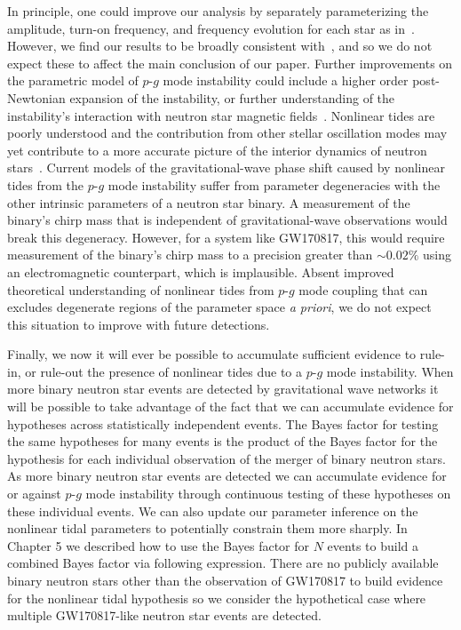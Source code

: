 In principle, one could improve our analysis by separately parameterizing the amplitude, turn-on frequency, and frequency evolution for each star as in~\cite{abbott2019constraining}. However, we find our results to be broadly consistent with~\cite{abbott2019constraining}, and so we do not expect these to affect the main conclusion of our paper. Further improvements on the  parametric model of $p$-$g$ mode instability could include a higher order post-Newtonian expansion of the instability, or further understanding of the instability's interaction with neutron star magnetic fields~\citep{Weinberg:2015pxa}. Nonlinear tides are poorly understood and the contribution from other stellar oscillation modes may yet contribute to a more accurate picture of the interior dynamics of neutron stars~\citep{Andersson:2017iav}. Current models of the gravitational-wave phase shift caused by nonlinear tides from the $p$-$g$ mode instability  suffer from parameter degeneracies with the other intrinsic parameters of a neutron star binary. A measurement of the binary's chirp mass that is independent of gravitational-wave observations would break this degeneracy. However, for a system like GW170817, this would require measurement of the binary's chirp mass to a precision greater than $\sim 0.02 \%$ using an electromagnetic counterpart, which is implausible. Absent improved theoretical understanding of  nonlinear tides from $p$-$g$ mode coupling that can excludes degenerate regions of the parameter space \emph{a priori}, we do not expect this situation to improve with future detections.

Finally, we now it will ever be possible to accumulate sufficient evidence to rule-in, or rule-out the presence of nonlinear tides due to a $p$-$g$ mode instability. When more binary neutron star events are detected by gravitational wave networks it will be possible to take advantage of the fact that we can accumulate evidence for hypotheses across statistically independent events. The Bayes factor for testing the same hypotheses for many events is the product of the Bayes factor for the hypothesis for each individual observation of the merger of binary neutron stars. As more binary neutron star events are detected we can accumulate evidence for or against $p$-$g$ mode instability through continuous testing of these hypotheses on these individual events. We can also update our parameter inference on the nonlinear tidal parameters to potentially constrain them more sharply. In Chapter 5 we described how to use the Bayes factor for $N$ events to build a combined Bayes factor via following expression. There are no publicly available binary neutron stars other than the observation of GW170817 to build evidence for the nonlinear tidal hypothesis so we consider the hypothetical case where multiple GW170817-like neutron star events are detected.

